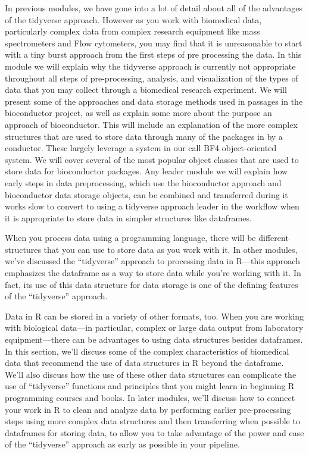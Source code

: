 \documentclass[]{tufte-book}
\begin{document}
In previous modules, we have gone into a lot of detail about all of the advantages of the tidyverse approach. However as you work with biomedical data, particularly complex data from complex research equipment like mass spectrometers and Flow cytometers, you may find that it is unreasonable to start with a tiny burst approach from the first steps of pre processing the data. In this module we will explain why the tidyverse approach is currently not appropriate throughout all steps of pre-processing, analysis, and visualization of the types of data that you may collect through a biomedical research experiment. We will present some of the approaches and data storage methods used in passages in the bioconductor project, as well as explain some more about the purpose an approach of bioconductor. This will include an explanation of the more complex structures that are used to store data through many of the packages in by a conductor. These largely leverage a system in our call BF4 object-oriented system. We will cover several of the most popular object classes that are used to store data for bioconductor packages. Any leader module we will explain how early steps in data preprocessing, which use the bioconductor approach and bioconductor data storage objects, can be combined and transferred during it works slow to convert to using a tidyverse approach leader in the workflow when it is appropriate to store data in simpler structures like dataframes.

When you process data using a programming language, there will be different
structures that you can use to store data as you work with it. In other modules,
we've discussed the ``tidyverse'' approach to processing data in R---this approach
emphasizes the dataframe as a way to store data while you're working with it.
In fact, its use of this data structure for data storage is one of the defining
features of the ``tidyverse'' approach.

Data in R can be stored in a variety of other formats, too. When you are working
with biological data---in particular, complex or large data output from laboratory
equipment---there can be advantages to using data structures besides dataframes.
In this section, we'll discuss some of the complex characteristics of biomedical
data that recommend the use of data structures in R beyond the dataframe. We'll
also discuss how the use of these other data structures can complicate the use of
``tidyverse'' functions and principles that you might learn in beginning R programming
courses and books. In later modules, we'll discuss how to connect your work in R
to clean and analyze data by performing earlier pre-processing steps using more
complex data structures and then transferring when possible to dataframes for
storing data, to allow you to take advantage of the power and ease of the
``tidyverse'' approach as early as possible in your pipeline.
\end{document}
